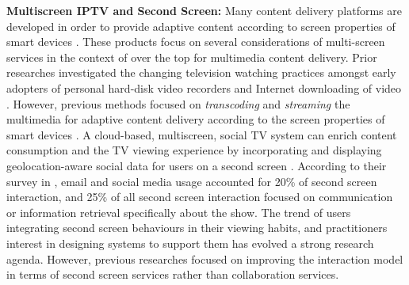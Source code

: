 \documentclass[conference]{IEEEtran}
\begin{document}
\noindent
\textbf{Multiscreen IPTV and Second Screen:}  
Many content delivery platforms are developed in order to provide adaptive content according to screen properties of smart devices \cite{Anstead:2014} .
These products focus on several considerations of multi-screen services in the context of over the top for multimedia content delivery. 
Prior researches investigated the changing television watching practices amongst early adopters of personal hard-disk video recorders and Internet downloading of video \cite{Barkhuus:2009}.
However, previous methods focused on \textit{transcoding} and \textit{streaming} the multimedia for adaptive content delivery according to the screen properties of smart devices \cite{Motti:2013}.
A cloud-based, multiscreen, social TV system can enrich content consumption and the TV viewing experience by incorporating and displaying geolocation-aware social data for users on a second screen \cite{Longo:2013}.
According to their survey in \cite{Nandakumar:2014}, email and social media usage accounted for 20\% of second screen interaction, and 25\% of all second screen interaction focused on communication or information retrieval specifically about the show. 
The trend of users integrating second screen behaviours in their viewing habits, and practitioners interest in designing systems to support them has evolved a strong research agenda. However, previous researches focused on improving the interaction model in terms of second screen services rather than collaboration services.
\end{document}

